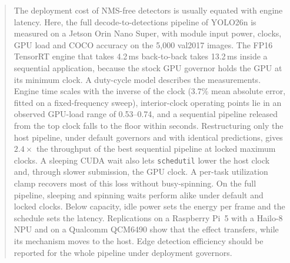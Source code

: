 \begin{abstract}
The deployment cost of NMS-free detectors is usually equated with
engine latency. Here, the full decode-to-detections pipeline of YOLO26n
is measured on a Jetson Orin Nano Super, with module input power,
clocks, GPU load and COCO accuracy on the 5,000 val2017 images. The
FP16 TensorRT engine that takes 4.2\,ms back-to-back takes 13.2\,ms
inside a sequential application, because the stock GPU governor holds
the GPU at its minimum clock. A duty-cycle model describes the
measurements. Engine time scales with the inverse of the clock (3.7\%
mean absolute error, fitted on a fixed-frequency sweep),
interior-clock operating points lie in an observed GPU-load range of
0.53--0.74, and a sequential pipeline released from the top clock
falls to the floor within seconds. Restructuring only the host
pipeline, under default governors and with identical predictions,
gives $2.4\times$ the throughput of the best sequential pipeline at
locked maximum clocks. A sleeping CUDA wait also lets
\texttt{schedutil} lower the host clock and, through slower
submission, the GPU clock. A per-task utilization clamp recovers most
of this loss without busy-spinning. On the full pipeline, sleeping and
spinning waits perform alike under default and locked clocks. Below
capacity, idle power sets the energy per frame and the schedule sets
the latency. Replications on a Raspberry Pi~5 with a Hailo-8 NPU and
on a Qualcomm QCM6490 show that the effect transfers, while its
mechanism moves to the host. Edge detection efficiency should be
reported for the whole pipeline under deployment governors.
\end{abstract}
